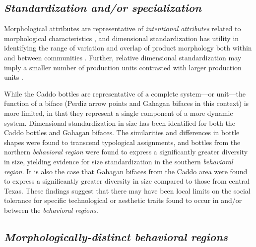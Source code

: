 \documentclass[smallextended]{svjour3}       %
\begin{document}
\hypertarget{standardization-andor-specialization}{%
\subsection{\texorpdfstring{\emph{Standardization and/or
specialization}}{Standardization and/or specialization}}\label{standardization-andor-specialization}}

Morphological attributes are representative of \emph{intentional
attributes} related to morphological characteristics \cite{RN7051}, and
dimensional standardization has utility in identifying the range of
variation and overlap of product morphology both within and between
communities \cite{RN5779}. Further, relative dimensional standardization
may imply a smaller number of production units contrasted with larger
production units \cite{RN7051}.

While the Caddo bottles are representative of a complete system---or
unit---the function of a biface (Perdiz arrow points and Gahagan bifaces
in this context) is more limited, in that they represent a single
component of a more dynamic system. Dimensional standardization in size
has been identified for both the Caddo bottles and Gahagan bifaces. The
similarities and differences in bottle shapes were found to transcend
typological assignments, and bottles from the northern \emph{behavioral
region} were found to express a significantly greater diversity in size,
yielding evidence for size standardization in the southern
\emph{behavioral region}. It is also the case that Gahagan bifaces from
the Caddo area were found to express a significantly greater diversity
in size compared to those from central Texas. These findings suggest
that there may have been local limits on the social tolerance for
specific technological or aesthetic traits found to occur in and/or
between the \emph{behavioral regions}.

\hypertarget{morphologically-distinct-behavioral-regions}{%
\subsection{\texorpdfstring{\emph{Morphologically-distinct behavioral
regions}}{Morphologically-distinct behavioral regions}}\label{morphologically-distinct-behavioral-regions}}
\end{document}
